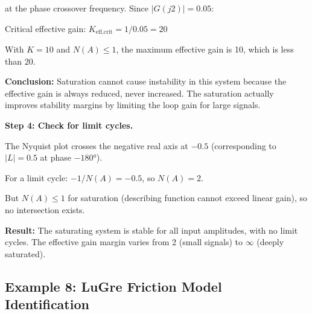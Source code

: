 \begin{example}
at the phase crossover frequency. Since $|G(j2)| = 0.05$:

Critical effective gain: $K_{\text{eff,crit}} = 1/0.05 = 20$

With $K = 10$ and $N(A) \leq 1$, the maximum effective gain is 10, which is less than 20.

\textbf{Conclusion:} Saturation cannot cause instability in this system because the effective gain is always reduced, never increased. The saturation actually improves stability margins by limiting the loop gain for large signals.

\textbf{Step 4: Check for limit cycles.}

The Nyquist plot crosses the negative real axis at $-0.5$ (corresponding to $|L| = 0.5$ at phase $-180°$).

For a limit cycle: $-1/N(A) = -0.5$, so $N(A) = 2$.

But $N(A) \leq 1$ for saturation (describing function cannot exceed linear gain), so no intersection exists.

\textbf{Result:} The saturating system is stable for all input amplitudes, with no limit cycles. The effective gain margin varies from 2 (small signals) to $\infty$ (deeply saturated).
\end{example}

\subsection{Example 8: LuGre Friction Model Identification}

